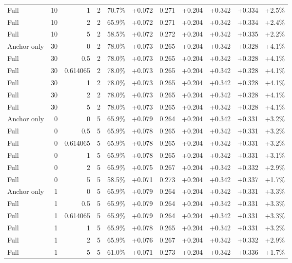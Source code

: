 \begin{table}[htbp]
\begin{tabular}{lrrrccccccc}
Full & 10 & 1 & 2 & 70.7\% & +0.072 & 0.271 & +0.204 & +0.342 & +0.334 & +2.5\% \\
Full & 10 & 2 & 2 & 65.9\% & +0.072 & 0.271 & +0.204 & +0.342 & +0.334 & +2.4\% \\
Full & 10 & 5 & 2 & 58.5\% & +0.072 & 0.272 & +0.204 & +0.342 & +0.335 & +2.2\% \\
Anchor only & 30 & 0 & 2 & 78.0\% & +0.073 & 0.265 & +0.204 & +0.342 & +0.328 & +4.1\% \\
Full & 30 & 0.5 & 2 & 78.0\% & +0.073 & 0.265 & +0.204 & +0.342 & +0.328 & +4.1\% \\
Full & 30 & 0.614065 & 2 & 78.0\% & +0.073 & 0.265 & +0.204 & +0.342 & +0.328 & +4.1\% \\
Full & 30 & 1 & 2 & 78.0\% & +0.073 & 0.265 & +0.204 & +0.342 & +0.328 & +4.1\% \\
Full & 30 & 2 & 2 & 78.0\% & +0.073 & 0.265 & +0.204 & +0.342 & +0.328 & +4.1\% \\
Full & 30 & 5 & 2 & 78.0\% & +0.073 & 0.265 & +0.204 & +0.342 & +0.328 & +4.1\% \\
Anchor only & 0 & 0 & 5 & 65.9\% & +0.079 & 0.264 & +0.204 & +0.342 & +0.331 & +3.2\% \\
Full & 0 & 0.5 & 5 & 65.9\% & +0.078 & 0.265 & +0.204 & +0.342 & +0.331 & +3.2\% \\
Full & 0 & 0.614065 & 5 & 65.9\% & +0.078 & 0.265 & +0.204 & +0.342 & +0.331 & +3.2\% \\
Full & 0 & 1 & 5 & 65.9\% & +0.078 & 0.265 & +0.204 & +0.342 & +0.331 & +3.1\% \\
Full & 0 & 2 & 5 & 65.9\% & +0.075 & 0.267 & +0.204 & +0.342 & +0.332 & +2.9\% \\
Full & 0 & 5 & 5 & 58.5\% & +0.071 & 0.273 & +0.204 & +0.342 & +0.337 & +1.7\% \\
Anchor only & 1 & 0 & 5 & 65.9\% & +0.079 & 0.264 & +0.204 & +0.342 & +0.331 & +3.3\% \\
Full & 1 & 0.5 & 5 & 65.9\% & +0.079 & 0.264 & +0.204 & +0.342 & +0.331 & +3.3\% \\
Full & 1 & 0.614065 & 5 & 65.9\% & +0.079 & 0.264 & +0.204 & +0.342 & +0.331 & +3.3\% \\
Full & 1 & 1 & 5 & 65.9\% & +0.078 & 0.265 & +0.204 & +0.342 & +0.331 & +3.2\% \\
Full & 1 & 2 & 5 & 65.9\% & +0.076 & 0.267 & +0.204 & +0.342 & +0.332 & +2.9\% \\
Full & 1 & 5 & 5 & 61.0\% & +0.071 & 0.273 & +0.204 & +0.342 & +0.336 & +1.7\% \\

\end{tabular}
\end{table}
